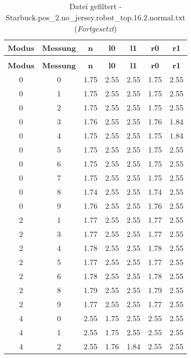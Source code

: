 \begin{longtable}{|c|c||c||c|c||c|c|}
	\caption{Datei gefiltert - Starbuck.pos\_2.no\_jersey.robot\_top.16.2.normal.txt} \label{tab:Starbuck.pos-2.no-jersey.robot-top.16.2.normal.txt} \\ \hline
	\textbf{Modus} & \textbf{Messung} & \textbf{n} & \textbf{l0} & \textbf{l1} & \textbf{r0} & \textbf{r1}\\ \hline
	\endfirsthead
	\caption[]{Datei gefiltert - Starbuck.pos\_2.no\_jersey.robot\_top.16.2.normal.txt (\emph{Fortgesetzt})} \\ \hline
	\textbf{Modus} & \textbf{Messung} & \textbf{n} & \textbf{l0} & \textbf{l1} & \textbf{r0} & \textbf{r1}\\ \hline
	\endhead
	0 & 0 & 1.75 & 2.55 & 2.55 & 1.75 & 2.55 \\ \hline
	0 & 1 & 1.75 & 2.55 & 2.55 & 1.75 & 2.55 \\ \hline
	0 & 2 & 1.75 & 2.55 & 2.55 & 1.75 & 2.55 \\ \hline
	0 & 3 & 1.76 & 2.55 & 2.55 & 1.76 & 1.84 \\ \hline
	0 & 4 & 1.75 & 2.55 & 2.55 & 1.75 & 1.84 \\ \hline
	0 & 5 & 1.75 & 2.55 & 2.55 & 1.75 & 2.55 \\ \hline
	0 & 6 & 1.75 & 2.55 & 2.55 & 1.75 & 2.55 \\ \hline
	0 & 7 & 1.75 & 2.55 & 2.55 & 1.75 & 2.55 \\ \hline
	0 & 8 & 1.74 & 2.55 & 2.55 & 1.74 & 2.55 \\ \hline
	0 & 9 & 1.76 & 2.55 & 2.55 & 1.76 & 2.55 \\ \hline
	2 & 1 & 1.77 & 2.55 & 2.55 & 1.77 & 2.55 \\ \hline
	2 & 3 & 1.77 & 2.55 & 2.55 & 1.77 & 2.55 \\ \hline
	2 & 4 & 1.78 & 2.55 & 2.55 & 1.78 & 2.55 \\ \hline
	2 & 5 & 1.77 & 2.55 & 2.55 & 1.77 & 2.55 \\ \hline
	2 & 6 & 1.78 & 2.55 & 2.55 & 1.78 & 2.55 \\ \hline
	2 & 8 & 1.79 & 2.55 & 2.55 & 1.79 & 2.55 \\ \hline
	2 & 9 & 1.77 & 2.55 & 2.55 & 1.77 & 2.55 \\ \hline
	4 & 0 & 2.55 & 1.75 & 2.55 & 2.55 & 2.55 \\ \hline
	4 & 1 & 2.55 & 1.75 & 2.55 & 2.55 & 2.55 \\ \hline
	4 & 2 & 2.55 & 1.76 & 1.84 & 2.55 & 2.55 \\ \hline

\end{longtable}
